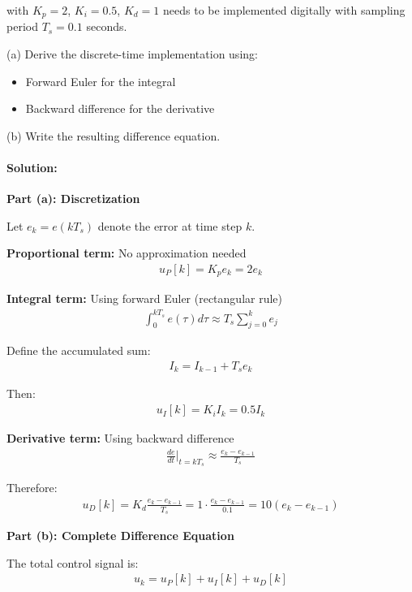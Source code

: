 \documentclass[11pt,a4paper]{article}
\begin{document}
with $K_p = 2$, $K_i = 0.5$, $K_d = 1$ needs to be implemented digitally with sampling period $T_s = 0.1$ seconds.

(a) Derive the discrete-time implementation using:
\begin{itemize}
\item Forward Euler for the integral
\item Backward difference for the derivative
\end{itemize}

(b) Write the resulting difference equation.

\paragraph{Solution:}

\textbf{Part (a): Discretization}

Let $e_k = e(kT_s)$ denote the error at time step $k$.

\textbf{Proportional term:} No approximation needed
\begin{align}
u_P[k] = K_p e_k = 2e_k
\end{align}

\textbf{Integral term:} Using forward Euler (rectangular rule)
\begin{align}
\int_0^{kT_s} e(\tau)d\tau \approx T_s \sum_{j=0}^{k} e_j
\end{align}

Define the accumulated sum:
\begin{align}
I_k = I_{k-1} + T_s e_k
\end{align}

Then:
\begin{align}
u_I[k] = K_i I_k = 0.5 I_k
\end{align}

\textbf{Derivative term:} Using backward difference
\begin{align}
\frac{de}{dt}\bigg|_{t=kT_s} \approx \frac{e_k - e_{k-1}}{T_s}
\end{align}

Therefore:
\begin{align}
u_D[k] = K_d \frac{e_k - e_{k-1}}{T_s} = 1 \cdot \frac{e_k - e_{k-1}}{0.1} = 10(e_k - e_{k-1})
\end{align}

\textbf{Part (b): Complete Difference Equation}

The total control signal is:
\begin{align}
u_k = u_P[k] + u_I[k] + u_D[k]
\end{align}
\end{document}
